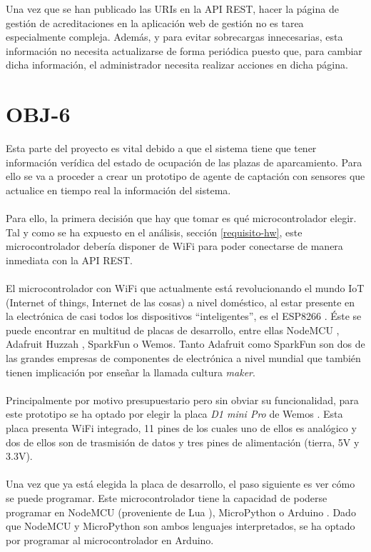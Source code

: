 Una vez que se han publicado las URIs en la API REST, hacer la página de gestión de acreditaciones en la aplicación web de gestión no es tarea especialmente compleja. Además, y para evitar sobrecargas innecesarias, esta información no necesita actualizarse de forma periódica puesto que, para cambiar dicha información, el administrador necesita realizar acciones en dicha página.

\section{OBJ-6}
Esta parte del proyecto es vital debido a que el sistema tiene que tener información verídica del estado de ocupación de las plazas de aparcamiento. Para ello se va a proceder a crear un prototipo de agente de captación con sensores que actualice en tiempo real la información del sistema.
\\\\
Para ello, la primera decisión que hay que tomar es qué microcontrolador elegir. Tal y como se ha expuesto en el análisis, sección \ref{requisito-hw}, este microcontrolador debería disponer de WiFi para poder conectarse de manera inmediata con la API REST.
\\\\
El microcontrolador con WiFi que actualmente está revolucionando el mundo IoT (Internet of things, Internet de las cosas) a nivel doméstico, al estar presente en la electrónica de casi todos los dispositivos ``inteligentes'', es el ESP8266 \cite{esp8266}. Éste se puede encontrar en multitud de placas de desarrollo, entre ellas NodeMCU \cite{nodemcu}, Adafruit Huzzah \cite{huzzah}, SparkFun \cite{sparkfun-esp8266} o Wemos. Tanto Adafruit como SparkFun son dos de las grandes empresas de componentes de electrónica a nivel mundial que también tienen implicación por enseñar la llamada cultura \textit{maker}.
\\\\
Principalmente por motivo presupuestario pero sin obviar su funcionalidad, para este prototipo se ha optado por elegir la placa \textit{D1 mini Pro} de Wemos \cite{d1}. Esta placa presenta WiFi integrado, 11 pines de los cuales uno de ellos es analógico y dos de ellos son de trasmisión de datos y tres pines de alimentación (tierra, 5V y 3.3V).
\\\\
Una vez que ya está elegida la placa de desarrollo, el paso siguiente es ver cómo se puede programar. Este microcontrolador tiene la capacidad de poderse programar en NodeMCU \cite{nodemcu-firmware} (proveniente de Lua \cite{lua}), MicroPython \cite{micropython} o Arduino \cite{arduino}. Dado que NodeMCU y MicroPython son ambos lenguajes interpretados, se ha optado por programar al microcontrolador en Arduino.
